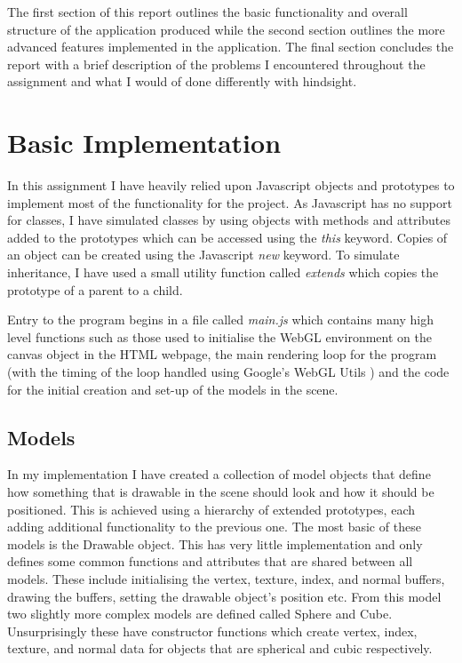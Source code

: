\documentclass[conference]{IEEEtran}
\begin{document}
The first section of this report outlines the basic functionality and overall structure of the application produced while the second section outlines the more advanced features implemented in the application. The final section concludes the report with a brief description of the problems I encountered throughout the assignment and what I would of done differently with hindsight.

\section{Basic Implementation}
In this assignment I have heavily relied upon Javascript objects and prototypes to implement most of the functionality for the project. As Javascript has no support for classes, I have simulated classes by using objects with methods and attributes added to the prototypes which can be accessed using the \textit{this} keyword. Copies of an object can be created using the Javascript \textit{new} keyword. To simulate inheritance, I have used a small utility function called \textit{extends} which copies the prototype of a parent to a child.

Entry to the program begins in a file called \textit{main.js} which contains many high level functions such as those used to initialise the WebGL environment on the canvas object in the HTML webpage, the main rendering loop for the program (with the timing of the loop handled using Google's WebGL Utils \cite{webgl-utils}) and the code for the initial creation and set-up of the models in the scene.

\subsection{Models}
In my implementation I have created a collection of model objects that define how something that is drawable in the scene should look and how it should be positioned. This is achieved using a hierarchy of extended prototypes, each adding additional functionality to the previous one. The most basic of these models is the Drawable object. This has very little implementation and only defines some common functions and attributes that are shared between all models. These include initialising the vertex, texture, index, and normal buffers, drawing the buffers, setting the drawable object's position etc. From this model two slightly more complex models are defined called Sphere and Cube. Unsurprisingly these have constructor functions which create vertex, index, texture, and normal data for objects that are spherical and cubic respectively.
\end{document}
